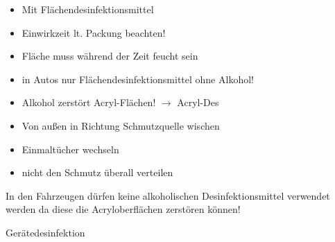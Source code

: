 \documentclass{article}
\begin{document}
\begin{itemize}
\item Mit
Fl\"achendesinfektionsmittel 

\item Einwirkzeit lt. Packung beachten!

\item Fl\"ache muss w\"ahrend der Zeit feucht sein

\item in Autos nur Fl\"achendesinfektionsmittel ohne Alkohol!

\end{itemize}
\begin{itemize}
\item Alkohol zerst\"ort Acryl-Fl\"achen! ${\rightarrow}$
Acryl-Des{\texttrademark}  

\end{itemize}
\begin{itemize}
\item Von au{\ss}en in Richtung Schmutzquelle wischen

\item Einmalt\"ucher wechseln

\end{itemize}
\begin{itemize}
\item nicht den Schmutz \"uberall verteilen

\end{itemize}
In den Fahrzeugen d\"urfen keine alkoholischen Desinfektionsmittel
verwendet werden da diese die Acryloberfl\"achen zerst\"oren k\"onnen!

Ger\"atedesinfektion
\end{document}
